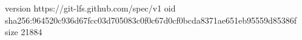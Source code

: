 version https://git-lfs.github.com/spec/v1
oid sha256:964520c936d67fcc03d705083c0f0c67d0cf0bcda8371ae651eb95559d85386f
size 21884
